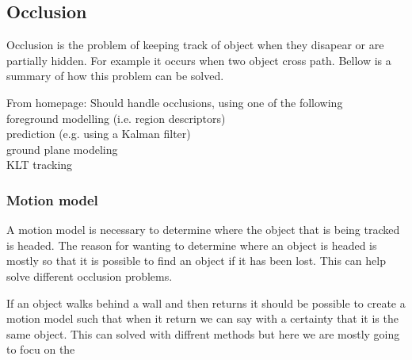 \subsection{Occlusion}
Occlusion is the problem of keeping track of object when they disapear or are partially hidden. For example it occurs when two object cross path. Bellow is a summary of how this problem can be solved.

From homepage:
Should handle occlusions, using one of the following\\
foreground modelling (i.e. region descriptors)\\
prediction (e.g. using a Kalman filter)\\
ground plane modeling\\
KLT tracking

\subsubsection{Motion model}
A motion model is necessary to determine where the object that is being tracked is headed. The reason for wanting to determine where an object is headed is mostly so that it is possible to find an object if it has been lost. This can help solve different occlusion problems.

If an object walks behind a wall and then returns it should be possible to create a motion model such that when it return we can say with a certainty that it is the same object. This can solved with diffrent methods but here we are mostly going to focu on the 
